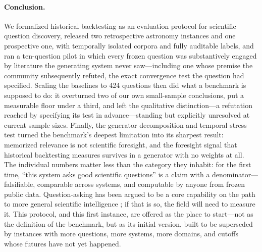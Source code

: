 \paragraph{Conclusion.} We formalized historical backtesting as an
evaluation protocol for scientific question discovery, released two
retrospective astronomy instances and one prospective one, with
temporally isolated corpora and
fully auditable labels, and ran a ten-question pilot in which every
frozen question was substantively engaged by literature the generating
system never saw---including one whose premise the community
subsequently refuted, the exact convergence test the question had
specified. Scaling the baselines to 424 questions then did what a
benchmark is supposed to do: it overturned two of our own small-sample
conclusions, put a measurable floor under a third, and left the
qualitative distinction---a refutation reached by specifying its test
in advance---standing but explicitly unresolved at current sample
sizes. Finally, the generator decomposition and temporal stress test
turned the benchmark's deepest limitation into its sharpest result:
memorized relevance is not scientific foresight, and the foresight
signal that historical backtesting measures survives in a generator
with no weights at all. The individual numbers matter less than the category they
inhabit: for the first time, ``this system asks good scientific
questions'' is a claim with a denominator---falsifiable, comparable
across systems, and computable by anyone from frozen public data.
Question-asking has been argued to be a core capability on the path to
more general scientific intelligence \citep{kitano2021,paper1}; if that
is so, the field will need to measure it. This protocol, and this first
instance, are offered as the place to start---not as the definition of
the benchmark, but as its initial version, built to be superseded by
instances with more questions, more systems, more domains, and cutoffs
whose futures have not yet happened.
